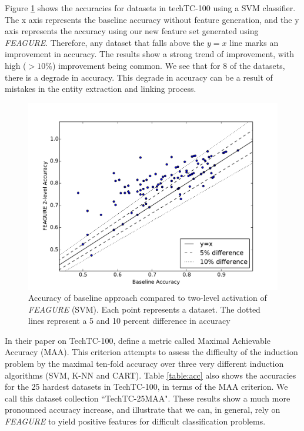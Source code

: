 \documentclass[twoside,11pt]{article}
\theoremstyle{definition}
\begin{document}
Figure \ref{fig:svm_base_lvl2} shows the accuracies for datasets in techTC-100 using a SVM classifier. The x axis represents the baseline accuracy without feature generation, and the y axis represents the accuracy using our new feature set generated using \emph{FEAGURE}. Therefore, any dataset that falls above the $y=x$ line marks an improvement in accuracy. 
The results show a strong trend of improvement, with high ($>10\%$) improvement being common.
We see that for 8 of the datasets, there is a degrade in accuracy. This degrade in accuracy can be a result of mistakes in the entity extraction and linking process.

\begin{figure}
	\centering
	\includegraphics[width=0.7\linewidth]{svm_full_lvl2}
	\caption{Accuracy of
		baseline approach compared to two-level activation of \emph{FEAGURE} (SVM). Each point represents a dataset. The dotted lines represent a 5 and 10 percent difference in accuracy}
	\label{fig:svm_base_lvl2}
\end{figure}


In their paper on TechTC-100, \cite{gabrilovich2004text} define a metric called Maximal Achievable Accuracy (MAA). This criterion attempts to assess the difficulty of the induction problem by the maximal ten-fold accuracy over three very different induction algorithms (SVM, K-NN and CART).
Table \ref{table:acc} also shows the accuracies for the 25 hardest datasets in TechTC-100, in terms of the MAA criterion. We call this dataset collection ``TechTC-25MAA". 
These results show a much more pronounced accuracy increase, and illustrate that we can, in general, rely on \emph{FEAGURE} to yield positive features for difficult classification problems.
\end{document}
